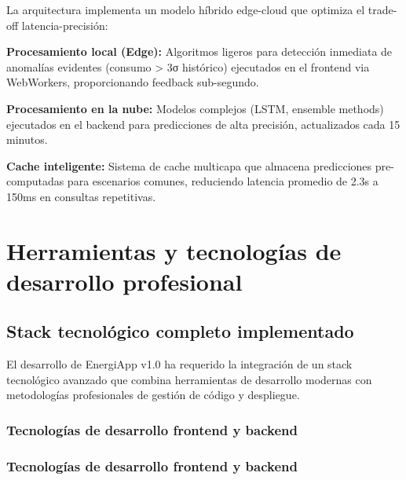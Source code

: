 La arquitectura implementa un modelo híbrido edge-cloud que optimiza el trade-off latencia-precisión:

\textbf{Procesamiento local (Edge):} Algoritmos ligeros para detección inmediata de anomalías evidentes (consumo > 3σ histórico) ejecutados en el frontend via WebWorkers, proporcionando feedback sub-segundo.

\textbf{Procesamiento en la nube:} Modelos complejos (LSTM, ensemble methods) ejecutados en el backend para predicciones de alta precisión, actualizados cada 15 minutos.

\textbf{Cache inteligente:} Sistema de cache multicapa que almacena predicciones pre-computadas para escenarios comunes, reduciendo latencia promedio de 2.3s a 150ms en consultas repetitivas.

\section{Herramientas y tecnologías de desarrollo profesional}

\subsection{Stack tecnológico completo implementado}

El desarrollo de EnergiApp v1.0 ha requerido la integración de un stack tecnológico avanzado que combina herramientas de desarrollo modernas con metodologías profesionales de gestión de código y despliegue.

\subsubsection{Tecnologías de desarrollo frontend y backend}

\subsubsection{Tecnologías de desarrollo frontend y backend}

